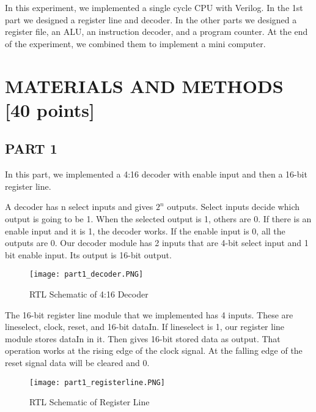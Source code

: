 \documentclass[pdftex,12pt,a4paper]{article}
\begin{document}
In this experiment, we implemented a single cycle CPU with Verilog. In the 1st part we designed a register line and decoder. In the other parts we designed a register file, an ALU, an instruction decoder, and a program counter. At the end of the experiment, we combined them to implement a mini computer.


\section{MATERIALS AND METHODS [40 points]}



\subsection{PART 1}
In this part, we implemented a 4:16 decoder with enable input and then a 16-bit register line. 

A decoder has n select inputs and gives \(2^n\) outputs. Select inputs decide which output is going to be 1. When the selected output is 1, others are 0. If there is an enable input and it is 1, the decoder works. If the enable input is 0, all the outputs are 0. Our decoder module has 2 inputs that are 4-bit select input and 1 bit enable input. Its output is 16-bit output.

\begin{figure}[ht]
	\centering
	\texttt{[image: part1\_decoder.PNG]}	
	\caption{RTL Schematic of 4:16 Decoder}
	\label{fig1}
\end{figure}

The 16-bit register line module that we implemented has 4 inputs. These are lineselect, clock, reset, and 16-bit dataIn. If lineselect is 1, our register line module stores dataIn in it. Then gives 16-bit stored data as output. That operation works at the rising edge of the clock signal.  At the falling edge of the reset signal data will be cleared and 0.

\begin{figure}[ht]
	\centering
	\texttt{[image: part1\_registerline.PNG]}	
	\caption{RTL Schematic of Register Line}
	\label{fig1}
\end{figure}

\clearpage
\end{document}
